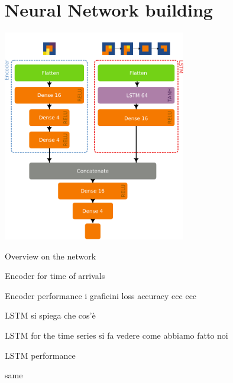 \documentclass{beamer}
\begin{document}
\section{Neural Network building}

    \centering
    \includegraphics[width=0.6\textwidth]{model.pdf}
\begin{frame}{Overview on the network}

    
\end{frame}

\begin{frame}{Encoder for time of arrivals}

    
\end{frame}
\begin{frame}{Encoder performance}
i graficini loss accuracy ecc ecc
    
\end{frame}

\begin{frame}{LSTM}
si spiega che cos'è
    
\end{frame}

\begin{frame}{LSTM for the time series}
si fa vedere come abbiamo fatto noi
    
\end{frame}

\begin{frame}{LSTM performance}

    same
\end{frame}
\end{document}
